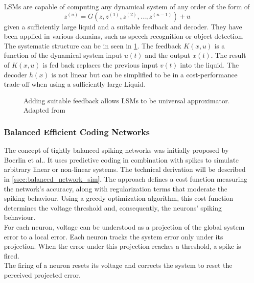 \acp{LSM} are capable of computing any dynamical system of any order of the form of
\begin{equation}
	z^{(n)} = G(z,z^{(1)},z^{(2)},\dots,z^{(n-1)}) + u
\end{equation}
given a sufficiently large liquid and a suitable feedback and decoder\cite{maass_computational_2004}. They have been applied  in various domains, such as speech recognition\cite{jin_performance_2017}\cite{zhang_digital_2015} or object detection\cite{soures_deep_2019}. The systematic structure can be in seen in \cref{fig:LSM_feedback}. The feedback $K(x,u)$ is a function of the dynamical system input $u(t)$ and the output $x(t)$. The result of $K(x,u)$ is fed back replaces the previous input $v(t)$ into the liquid. The decoder $h(x)$ is not linear but can be simplified to be in a cost-performance trade-off when using a sufficiently large Liquid.\\
\begin{figure}[htbp]
	\centering
	
	\caption{Adding suitable feedback allows \acp{LSM} to be universal approximator. Adapted from \cite{maass_computational_2007}}
	\label{fig:LSM_feedback}
\end{figure}

\subsubsection{Balanced Efficient Coding Networks}
The concept of tightly balanced spiking networks was initially proposed by Boerlin et al.\cite{boerlin_predictive_2013}. It uses predictive coding in combination with spikes to simulate arbitrary linear or non-linear systems\cite{alemi_learning_2017}.
The technical derivation will be described in \cref{ssec:balanced_network_sim}. The approach defines a cost function measuring the network's accuracy, along with regularization terms that moderate the spiking behaviour. Using a greedy optimization algorithm, this cost function determines the voltage threshold and, consequently, the neurons' spiking behaviour.\\
For each neuron, voltage can be understood as a projection of the global system error to a local error. Each neuron tracks the system error only under its projection. When the error under this projection reaches a threshold, a spike is fired.\\
The firing of a neuron resets its voltage and corrects the system to reset the perceived projected error.\\

